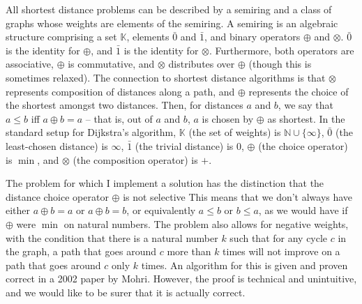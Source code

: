 All shortest distance problems can be described by a semiring and a class of graphs whose weights are elements of the semiring.
A semiring is an algebraic structure comprising a set $\mathbb K$, elements $\bar 0$ and $\bar 1$, and binary operators $\oplus$ and $\otimes$.
$\bar 0$ is the identity for $\oplus$, and $\bar 1$ is the identity for $\otimes$.
Furthermore, both operators are associative, $\oplus$ is commutative, and $\otimes$ distributes over $\oplus$ (though this is sometimes relaxed).
The connection to shortest distance algorithms is that $\otimes$ represents composition of distances along a path, and $\oplus$ represents the choice of the shortest amongst two distances.
Then, for distances $a$ and $b$, we say that $a \leq b$ iff $a \oplus b = a$ -- that is, out of $a$ and $b$, $a$ is chosen by $\oplus$ as shortest.
In the standard setup for Dijkstra's algorithm, $\mathbb K$ (the set of weights) is $\mathbb N \cup \{ \infty \}$, $\bar 0$ (the least-chosen distance) is $\infty$, $\bar 1$ (the trivial distance) is $0$, $\oplus$ (the choice operator) is $\min$, and $\otimes$ (the composition operator) is $+$.

The problem for which I implement a solution has the distinction that the distance choice operator $\oplus$ is not selective
This means that we don't always have either $a \oplus b = a$ or $a \oplus b = b$, or equivalently $a \leq b$ or $b \leq a$, as we would have if $\oplus$ were $\min$ on natural numbers.
The problem also allows for negative weights, with the condition that there is a natural number $k$ such that for any cycle $c$ in the graph, a path that goes around $c$ more than $k$ times will not improve on a path that goes around $c$ only $k$ times.
An algorithm for this is given and proven correct in a 2002 paper by Mohri\cite{mohri02}.
However, the proof is technical and unintuitive, and we would like to be surer that it is actually correct.
